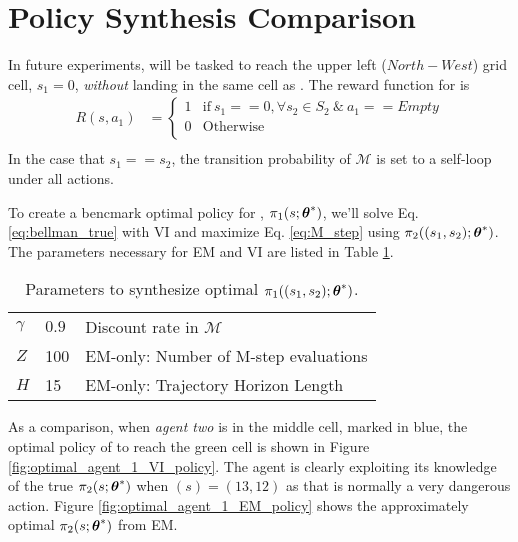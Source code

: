\section{Policy Synthesis Comparison} \label{sec:em_vi_comparison}
In future experiments,  will be tasked to reach the upper left ($North-West$) grid cell, $s_1=0$, \emph{without} landing in the same cell as . The reward function for  is
\begin{align*}
	R(s,a_1) & = \begin{cases}
1 & \text{if}\ s_1 == 0, \forall s_2 \in S_2\ \&\ a_1==Empty \\
0 & \text{Otherwise} \\
\end{cases} \\
\end{align*}
In the case that $s_1==s_2$, the transition probability of $\mathcal{M}$ is set to a self-loop under all actions. 

To create a bencmark optimal policy for , $\pi_{1}(s;\boldsymbol{\mathbb{\theta}}^*)$, we'll solve Eq. \ref{eq:bellman_true} with \ac{VI} and maximize Eq. \ref{eq:M_step} using $\pi_{2}((s_1,s_2);\boldsymbol{\mathbb{\theta}}^*)$. The parameters necessary for EM and VI are listed in Table \ref{table:optimal_agent_1_EM_policy_params}.

\begin{table}[H]
	\centering
	\begin{tabular}{l|l l}
		$\gamma$ & $0.9$ & Discount rate in $\mathcal{M}$ \\
		$Z$ & 100 & EM-only: Number of M-step evaluations \\
		$H$ & 15 & EM-only: Trajectory Horizon Length \\
	\end{tabular}
	\caption{Parameters to synthesize optimal $\pi_{1}((s_1,s_2);\boldsymbol{\mathbb{\theta}}^*)$.}
	\label{table:optimal_agent_1_EM_policy_params}
\end{table}
As a comparison, when \emph{agent two} is in the middle cell, marked in blue, the optimal policy of  to reach the green cell is shown in Figure \ref{fig:optimal_agent_1_VI_policy}. The agent is clearly exploiting its knowledge of the true $\pi_{2}(s;\boldsymbol{\mathbb{\theta}}^*)$ when $(s) = (13,12)$ as that is normally a very dangerous action. Figure \ref{fig:optimal_agent_1_EM_policy} shows the approximately optimal $\pi_{2}(s;\boldsymbol{\mathbb{\theta}}^*)$ from EM.

    \begin{figure}[H]
	\begin{center}
	\end{center}
\end{figure}

